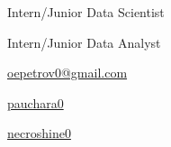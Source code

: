 \documentclass[11pt]{spidercv}
\begin{document}
    \PrintableMode

    \begin{TopBar}{\ColorTextSide}


        \begin{DoubleColumns}
            \begin{ItemList}{\ColorHighlight}
                    \item Intern/Junior Data Scientist
            \end{ItemList}
            \nextcolumn
            \begin{ItemList}{\ColorHighlight}
                    \item Intern/Junior Data Analyst
            \end{ItemList}
        \end{DoubleColumns}

        \vspace*{0.3cm}

        \begin{DoubleColumns}
            \begin{ItemList}{\ColorHighlight}
                \item [\Large\faEnvelopeO] \href{mailto:oepetrov0@gmail.com}{oepetrov0@gmail.com}
                \item [\Large\faPaperPlaneO] \href{https://t.me/pauchara0}{pauchara0}
            \end{ItemList}
            \nextcolumn
            \begin{ItemList}{\ColorHighlight}
                \item [\Large\faGithub] \href{https://github.com/necroshine0}{necroshine0}
            \end{ItemList}
            \nextcolumn
            \begin{ItemList}{\ColorHighlight}
            \end{ItemList}
        \end{DoubleColumns}

    \end{TopBar}
\end{document}
